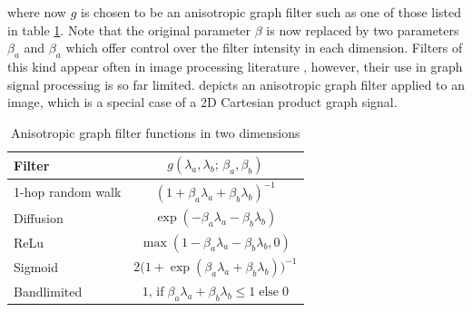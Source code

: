 where now $g$ is chosen to be an anisotropic graph filter such as one of those listed in table \ref{tab:anis_filters_2d}. Note that the original parameter $\beta$ is now replaced by two parameters $\beta_a$ and $\beta_a$ which offer control over the filter intensity in each dimension. Filters of this kind appear often in image processing literature \citep{Aubert2006}, however, their use in graph signal processing is so far limited.  depicts an anisotropic graph filter applied to an image, which is a special case of a 2D Cartesian product graph signal.  


\begin{table}[t]
    \def\arraystretch{1.7}
    \small
    \begin{center}
        \begin{tabular}{|l|c|}
            \hline
            \textbf{Filter}   & $g(\lambda_a, \lambda_b; \,\beta_a, \beta_b)$                                            \\
            \hline
            1-hop random walk & $(1 + \beta_a \lambda_a + \beta_b \lambda_b)^{-1}$                                   \\
            \hline
            Diffusion         & $\exp(-\beta_a \lambda_a - \beta_b \lambda_b)$                                       \\
            \hline
            ReLu              & $\max (1 - \beta_a \lambda_a - \beta_b \lambda_b, 0)$                                \\
            \hline
            Sigmoid           & $2 \big( 1 + \exp(\beta_a \lambda_a + \beta_b \lambda_b)\big)^{-1}$                  \\
            \hline
            Bandlimited       & $1, \,\text{if} \; \beta_a \lambda_a + \beta_b \lambda_b\leq 1 \; \text{else} \; 0$ \\
            \hline
        \end{tabular}
    \end{center}
    \caption{Anisotropic graph filter functions in two dimensions}
    \label{tab:anis_filters_2d}
\end{table}


